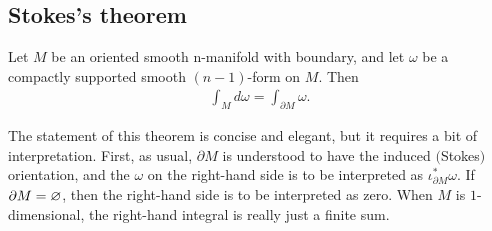 \subsection{Stokes's theorem}
\begin{theorem}\label{Stokes}
Let $M$ be an oriented smooth n-manifold with boundary, and let $\omega$ be a compactly supported smooth $(n-1)$-form on $M$. Then
\begin{align}\label{Stokes-1}
\int_Md\omega=\int_{\partial M}\omega.
\end{align}
\end{theorem}
\begin{remark}
The statement of this theorem is concise and elegant, but it requires a bit of interpretation. First, as usual, $\partial M$ is understood to have the induced $($Stokes$)$ orientation, and the $\omega$ on the right-hand side is to be interpreted as $\iota_{\partial M}^*\omega$. If $\partial M=\varnothing$, then the right-hand side is to be interpreted as zero. When $M$ is $1$-dimensional, the right-hand integral is really just a finite sum.
\end{remark}
